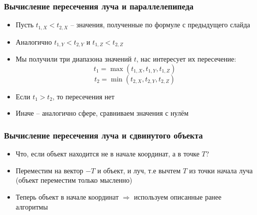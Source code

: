 \documentclass[10pt,handout]{beamer}
\begin{document}
\begin{frame}
\frametitle{Вычисление пересечения луча и параллелепипеда}
\begin{itemize}
\item Пусть \begin{math}t_{1,X} < t_{2,X}\end{math} -- значения, полученные по формуле с предыдущего слайда
\pause
\item Аналогично \begin{math}t_{1,Y} < t_{2,Y}\end{math} и \begin{math}t_{1,Z} < t_{2,Z}\end{math}
\pause
\item Мы получили три диапазона значений \begin{math}t\end{math}, нас интересует их пересечение:
\begin{equation}
t_1 = \max(t_{1,X}, t_{1,Y}, t_{1,Z})
\end{equation}
\begin{equation}
t_2 = \min(t_{2,X}, t_{2,Y}, t_{2,Z})
\end{equation}
\pause
\item Если \begin{math}t_1 > t_2\end{math}, то пересечения нет
\pause
\item Иначе -- аналогично сфере, сравниваем значения с нулём
\end{itemize}
\end{frame}

\begin{frame}
\frametitle{Вычисление пересечения луча и сдвинутого объекта}
\begin{itemize}
\item Что, если объект находится не в начале координат, а в точке \begin{math}T\end{math}?
\pause
\item Переместим на вектор \begin{math}-T\end{math} и объект, и луч, т.е вычтем \begin{math}T\end{math} из точки начала луча  (объект переместим только мысленно)
\pause
\item Теперь объект в начале координат \begin{math}\Longrightarrow\end{math} используем описанные ранее алгоритмы
\end{itemize}
\end{frame}
\end{document}
